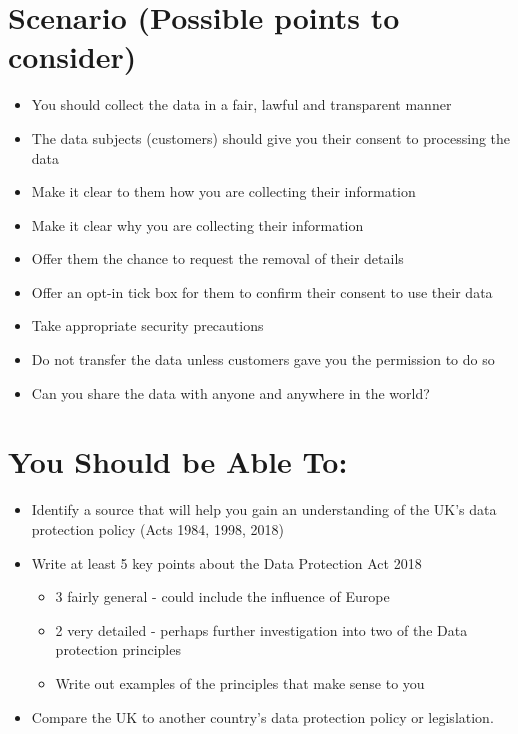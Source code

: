 \documentclass{article}
\begin{document}
\section{Scenario (Possible points to consider)}
\begin{itemize}
\item You should collect the data in a fair, lawful and transparent manner
\item The data subjects (customers) should give you their consent to processing the data
\item Make it clear to them how you are collecting their information
\item Make it clear why you are collecting their information
\item Offer them the chance to request the removal of their details
\item Offer an opt-in tick box for them to confirm their consent to use their data
\item Take appropriate security precautions
\item Do not transfer the data unless customers gave you the permission to do so
\item Can you share the data with anyone and anywhere in the world?
\end{itemize}



\section{You Should be Able To:}
\begin{itemize}
\item Identify a source that will help you gain an understanding of the UK's data protection policy (Acts 1984, 1998, 2018)
\item Write at least 5 key points about the Data Protection Act 2018
\begin{itemize}
\item 3 fairly general - could include the influence of Europe
\item 2 very detailed - perhaps further investigation into two of the Data protection principles 
\item Write out examples of the principles that make sense to you
\end{itemize}
\item Compare the UK to another country's data protection policy or legislation.
\end{itemize}
\end{document}
